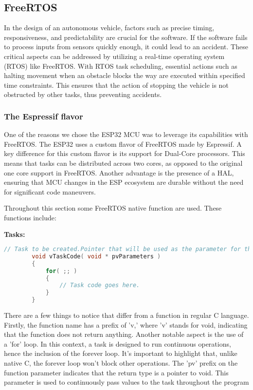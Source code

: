 \documentclass[../report.tex]{subfiles}
\begin{document}
    \subsection{FreeRTOS}
    In the design of an autonomous vehicle, factors such as precise timing,
    responsiveness, and predictability are crucial for the software. If the
    software fails to process inputs from sensors quickly enough, it could lead
    to an accident. These critical aspects can be addressed by utilizing a
    real-time operating system (RTOS) like FreeRTOS. With RTOS task scheduling,
    essential actions such as halting movement when an obstacle blocks the way
    are executed within specified time constraints. This ensures that the
    action of stopping the vehicle is not obstructed by other tasks, thus
    preventing accidents.

    \subsubsection{The Espressif flavor}
    One of the reasons we chose the ESP32 MCU was to leverage its capabilities
    with FreeRTOS. The ESP32 uses a custom flavor of FreeRTOS made by
    Espressif. A key difference for this custom flavor is its support for
    Dual-Core processors. This means that tasks can be distributed across two
    cores, as opposed to the original one core support in FreeRTOS. Another
    advantage is the presence of a HAL, ensuring that MCU changes in the ESP
    ecosystem are durable without the need for significant code maneuvers.

    Throughout this section some FreeRTOS native function are used. These
    functions include:

    \textbf{Tasks:}

    \begin{lstlisting}[language=c,caption={FreeRTOS task creation},label={code:task}]
        // Task to be created.Pointer that will be used as the parameter for the task being 
        void vTaskCode( void * pvParameters )
        {
            for( ;; )
            {
                // Task code goes here.
            }
        }
    \end{lstlisting}

    There are a few things to notice that differ from a function in regular C
    language. Firstly, the function name has a prefix of 'v,' where 'v' stands
    for void, indicating that the function does not return anything. Another
    notable aspect is the use of a 'for' loop. In this context, a task is
    designed to run continuous operations, hence the inclusion of the forever
    loop. It's important to highlight that, unlike native C, the forever loop
    won't block other operations. The 'pv' prefix on the function parameter
    indicates that the return type is a pointer to void. This parameter is used
    to continuously pass values to the task throughout the program
\end{document}
